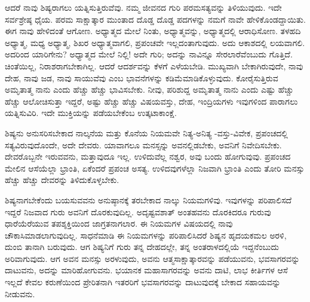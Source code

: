 ಆದರೆ ನಾವು ಶಿಷ್ಯರಾಗಲು ಯತ್ನಿಸುತ್ತಿರುವೆವು. ನಮ್ಮ ಜೀವನದ ಗುರಿ ಪರಮಸತ್ಯವನ್ನು ತಿಳಿಯುವುದು. ಇದೇ ಸರ್ವಶ್ರೇಷ್ಠ ಧೈಯ. ಪರಮ ಸಾಕ್ಷಾತ್ಕಾರ ಮುಂತಾದ ದೊಡ್ಡ ದೊಡ್ಡ ಪದಗಳನ್ನು ನಮಗೆ ನಾವೇ ಹೇಳಿಕೊಂಡದ್ದಾಯಿತು. ಈಗ ನಾವು ಹೇಳಿದಂತೆ ಆಗೋಣ. ಅಧ್ಯಾತ್ಮದ ಮೇಲೆ ನಿಂತು, ಅಧ್ಯಾತ್ಮವನ್ನು, ಅಧ್ಯಾತ್ಮದಲ್ಲಿ ಆರಾಧಿಸೋಣ. ತಳಹದಿ ಅಧ್ಯಾತ್ಮ, ಮಧ್ಯ ಅಧ್ಯಾತ್ಮ, ಶಿಖರ ಅಧ್ಯಾತ್ಮವಾಗಲಿ, ಪ್ರಪಂಚವೇ ಇಲ್ಲದಂತಾಗುವುದು. ಅದು ಆಕಾಶದಲ್ಲಿ ಲಯವಾಗಲಿ. ಅದರಿಂದ ಯಾರಿಗೇನು? ಅಧ್ಯಾತ್ಮದ ಮೇಲೆ ನಿಲ್ಲಿ! ಅದೇ ಗುರಿ; ಅದನ್ನು ನಾವಿನ್ನೂ ಸೇರಲಾರೆವೆಂಬುದು ಗೊತ್ತಿದೆ. ಚಿಂತೆಯಿಲ್ಲ, ನಿರಾಶರಾಗಬೇಕಾಗಿಲ್ಲ. ಆದರೆ ಆದರ್ಶವನ್ನು ಕೆಳಗೆ ಎಳೆಯಬೇಡಿ. ಮುಖ್ಯವಾಗಿ ಬೇಕಾಗಿರುವುದೇ, ನಾವು ದೇಹ, ನಾವು ಜಡ, ನಾವು ಸಾಯುವೆವು ಎಂಬ ಭಾವನೆಗಳನ್ನು ಕಡಿಮೆಮಾಡಿಕೊಳ್ಳುವುದು. ಕೋರೈಸುತ್ತಿರುವ ಅಮೃತಾತ್ಮ ನಾನು ಎಂದು ಹೆಚ್ಚು ಹೆಚ್ಚು ಭಾವಿಸಬೇಕು. ನೀವು, ಪರಿಶುದ್ದ ಅಮೃತಾತ್ಮ ನಾನು ಎಂದು ಎಷ್ಟು ಹೆಚ್ಚು ಹೆಚ್ಚು ಆಲೋಚಿಸುತ್ತಾ ಇದ್ದರೆ, ಅಷ್ಟು ಹೆಚ್ಚು ಹೆಚ್ಚು ವಿಷಯವಸ್ತು, ದೇಹ, ಇಂದ್ರಿಯಗಳು ಇವುಗಳಿಂದ ಪಾರಾಗಲು ಯತ್ನಿಸುವಿರಿ. ಇದೇ ಮುಕ್ತಿಯನ್ನು ಪಡೆಯಬೇಕೆಂಬ ಉತ್ಕಟಾಕಾಂಕ್ಷೆ.

ಶಿಷ್ಯನು ಅನುಸರಿಸಬೇಕಾದ ನಾಲ್ಕನೆಯ ಮತ್ತು ಕೊನೆಯ ನಿಯಮವೇ ನಿತ್ಯ-ಅನಿತ್ಯ -ವಸ್ತು-ವಿವೇಕ, ಪ್ರಪಂಚದಲ್ಲಿ ಸತ್ಯವಿರುವುದೊಂದೇ, ಅದೇ ದೇವರು. ಯಾವಾಗಲೂ ಮನಸ್ಸನ್ನು ಅವನಲ್ಲಿಡಬೇಕು, ಅವನಿಗೆ ನಿವೇದಿಸಬೇಕು. ದೇವರೊಬ್ಬನೇ ಇರುವವನು, ಮತ್ತಾವುದೂ ಇಲ್ಲ. ಉಳಿದುವೆಲ್ಲ ನಶ್ವರ, ಅವು ಬಂದು ಹೋಗುವುವು. ಪ್ರಪಂಚದ ಮೇಲಿನ ಆಸೆಯೆಲ್ಲಾ ಭ್ರಾಂತಿ, ಏಕೆಂದರೆ ಪ್ರಪಂಚ ಅಸತ್ಯ. ಉಳಿದವುಗಳೆಲ್ಲಾ ನಿಜವಾಗಿ ಭ್ರಾಂತಿ ಎಂದು ತೋರಿ ಮನಸ್ಸು ಹೆಚ್ಚು ಹೆಚ್ಚು ದೇವರನ್ನು ತಿಳಿದುಕೊಳ್ಳಬೇಕು.

ಶಿಷ್ಯನಾಗಬೇಕೆಂದು ಬಯಸುವವನು ಅನುಷ್ಠಾನಕ್ಕೆ ತರಬೇಕಾದ ನಾಲ್ಕು ನಿಯಮಗಳಿವು. ಇವುಗಳನ್ನು ಪರಿಪಾಲಿಸದೆ ಇದ್ದರೆ ನಿಜವಾದ ಗುರು ಅವನಿಗೆ ದೊರಕುವುದಿಲ್ಲ. ಅದೃಷ್ಟವಶಾತ್ ಅಂತಹವನು ದೊರಕಿದರೂ ಗುರುವು ಧಾರೆಯೆರೆಯುವ ತಪಶ್ಶಕ್ತಿಯಿಂದ ಜಾಗ್ರತನಾಗಲಾರ. ಈ ನಿಯಮಗಳ ವಿಷಯದಲ್ಲಿ ನಾವು ಚೌಕಾಸಿಮಾಡಲಾಗುವುದಿಲ್ಲ. ಸಾಧನೆಮಾಡಿ ಈ ನಿಯಮಗಳನ್ನು ಪರಿಪಾಲಿಸಿದರೆ ಶಿಷ್ಯನ ಹೃದಯಕಮಲ ಅರಳಿ, ದುಂಬಿ ತಾನಾಗಿ ಬರುವುದು. ಆಗ ಶಿಷ್ಯನಿಗೆ ಗುರು ತನ್ನ ದೇಹದಲ್ಲೇ, ತನ್ನ ಅಂತರಾಳದಲ್ಲಿಯೆ ಇದ್ದನೆಂಬುದು ಅರಿವಾಗುವುದು. ಆಗ ಅವನ ಮನಸ್ಸು ಅರಳುವುದು, ಅವನು ಆತ್ಮಸಾಕ್ಷಾತ್ಕಾರವನ್ನು ಪಡೆಯುವನು, ಭವಸಾಗರವನ್ನು ದಾಟುವನು, ಅದನ್ನು ಮಾರಿಹೋಗುವನು. ಭಯಾನಕ ಮಹಾಸಾಗರವನ್ನು ಅವನು ದಾಟಿ, ಲಾಭ ಕೀರ್ತಿಗಳ ಆಸೆ ಇಲ್ಲದೆ ಕೇವಲ ಕರುಣೆಯಿಂದ ಪ್ರೇರಿತನಾಗಿ ಇತರರಿಗೆ ಭವಸಾಗರವನ್ನು ದಾಟುವುದಕ್ಕೆ ಬೇಕಾದ ಸಹಾಯವನ್ನು ನೀಡುವನು.

